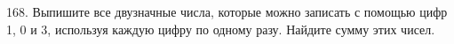 168. Выпишите все двузначные числа, которые можно записать с помощью цифр 1, 0 и 3, используя каждую цифру по одному разу. Найдите сумму этих чисел.\\

